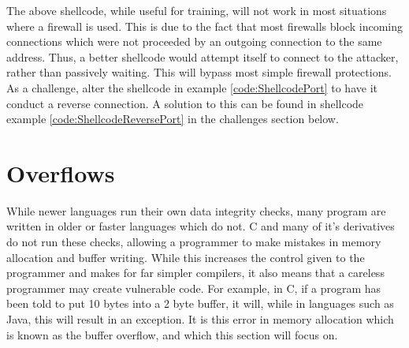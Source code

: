 \documentclass[a4paper,11pt]{report}
\begin{document}
				The above shellcode, while useful for training, will not work in most situations where a firewall is used. 
				This is due to the fact that most firewalls block incoming connections which were not proceeded by an outgoing connection to the same address. 
				Thus, a better shellcode would attempt itself to connect to the attacker, rather than passively waiting. 
				This will bypass most simple firewall protections. 
				As a challenge, alter the shellcode in example \ref{code:ShellcodePort} to have it conduct a reverse connection. 
				A solution to this can be found in shellcode example \ref{code:ShellcodeReversePort} in the challenges section below. 

	\section{Overflows}
		While newer languages run their own data integrity checks, many program are written in older or faster languages which do not. 
		C and many of it's derivatives do not run these checks, allowing a programmer to make mistakes in memory allocation and buffer writing. 
		While this increases the control given to the programmer and makes for far simpler compilers, it also means that a careless programmer may create vulnerable code. 
		For example, in C, if a program has been told to put 10 bytes into a 2 byte buffer, it will, while in languages such as Java, this will result in an exception. 
		It is this error in memory allocation which is known as the buffer overflow, and which this section will focus on. 
\end{document}
